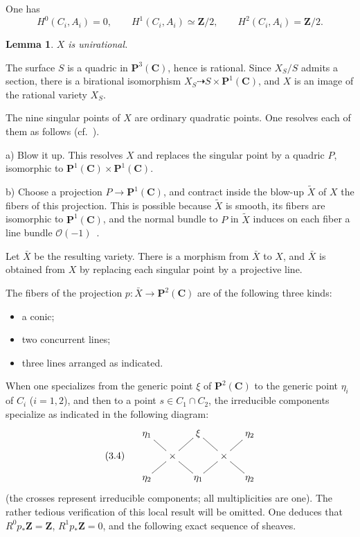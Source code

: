 \documentclass[12pt]{amsart}
\theoremstyle{plain}
\newtheorem{lemma}[theorem]{Lemma}
\theoremstyle{definition}
\theoremstyle{remark}
\begin{document}
One has
\begin{equation}\label{eq:3.2coho}
H^0(C_i,A_i)=0,\qquad H^1(C_i,A_i)\simeq \mathbf Z/2,\qquad H^2(C_i,A_i)=\mathbf Z/2.
\end{equation}

\begin{lemma}\label{lem:3.3}
$X$ is unirational.
\end{lemma}

The surface $S$ is a quadric in $\mathbf P^3(\mathbf C)$, hence is rational. Since
$X_S/S$ admits a section, there is a birational isomorphism
$X_S\dashrightarrow S\times \mathbf P^1(\mathbf C)$, and $X$ is an image of the rational
variety $X_S$.

\medskip
The nine singular points of $X$ are ordinary quadratic points. One resolves each
of them as follows (cf.~\cite{3}).

\smallskip
\noindent a) Blow it up. This resolves $X$ and replaces the singular point by a
quadric $P$, isomorphic to $\mathbf P^1(\mathbf C)\times \mathbf P^1(\mathbf C)$.

\smallskip
\noindent b) Choose a projection $P\to \mathbf P^1(\mathbf C)$, and contract inside
the blow-up $\widetilde X$ of $X$ the fibers of this projection. This is possible
because $\widetilde X$ is smooth, its fibers are isomorphic to
$\mathbf P^1(\mathbf C)$, and the normal bundle to $P$ in $\widetilde X$ induces on each
fiber a line bundle $\mathcal O(-1)$~\cite{8}.

\medskip
Let $\bar X$ be the resulting variety. There is a morphism from $\bar X$ to $X$, and
$\bar X$ is obtained from $X$ by replacing each singular point by a projective line.

The fibers of the projection $p\colon \bar X\to \mathbf P^2(\mathbf C)$ are of the
following three kinds:
\begin{itemize}
\item[$s\notin C_1\cup C_2$:] a conic;
\item[$s\in C_1\cup C_2$, $s\notin C_1\cap C_2$:] two concurrent lines;
\item[$s\in C_1\cap C_2$:] three lines arranged as indicated.
\end{itemize}

When one specializes from the generic point $\xi$ of $\mathbf P^2(\mathbf C)$ to the
generic point $\eta_i$ of $C_i$ ($i=1,2$), and then to a point
$s\in C_1\cap C_2$, the irreducible components specialize as indicated in the
following diagram:
\begin{equation}\label{eq:3.4}
\xymatrix@R=8pt@C=12pt{
& \eta_1 \ar@{-}[rd] & & \xi \ar@{-}[ld] \ar@{-}[rd] & & \eta_2 \ar@{-}[ld] \\
(3.4) & & \times & & \times & \\
& \eta_2 \ar@{-}[ru] & & \eta_1 \ar@{-}[lu] \ar@{-}[ru] & & \eta_2 \ar@{-}[lu]
}
\end{equation}
(the crosses represent irreducible components; all multiplicities are one). The
rather tedious verification of this local result will be omitted. One deduces that
$R^0p_*\mathbf Z=\mathbf Z$, $R^1p_*\mathbf Z=0$, and the following exact
sequence of sheaves.
\end{document}
